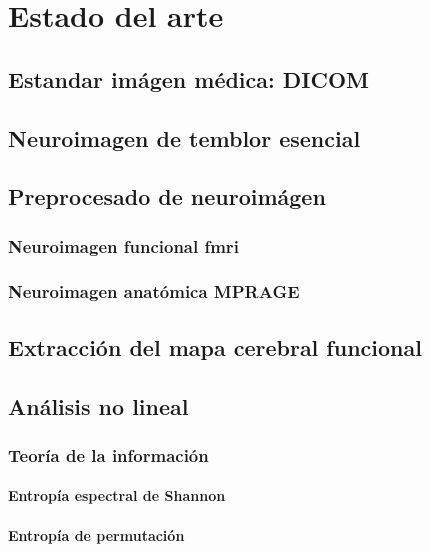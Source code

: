 \chapter{Estado del arte}
\section{Estandar imágen médica: DICOM}
\section{Neuroimagen de temblor esencial}
\section{Preprocesado de neuroimágen}
\subsection{Neuroimagen funcional fmri}
\subsection{Neuroimagen anatómica MPRAGE}
\section{Extracción del mapa cerebral funcional}
\section{Análisis no lineal}
\subsection{Teoría de la información}
\subsubsection{Entropía espectral de Shannon}
\subsubsection{Entropía de permutación}